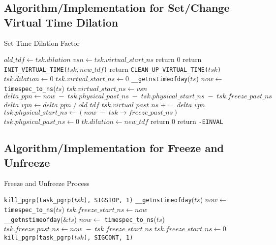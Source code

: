 \documentclass{acm_proc_article-sp}
\begin{document}
\subsection{Algorithm/Implementation for Set/Change Virtual Time Dilation}
\begin{algorithm*}[t]
\caption{Set Time Dilation Factor}
\label{Alg-SetTDF}
\begin{algorithmic}[1]
\State $old\_tdf \gets tsk.dilation$
\State $vsn \gets tsk.virtual\_start\_ns$
	\State return 0
	\State return \texttt{\uppercase{init\_virtual\_time}($tsk, new\_tdf$)}
	\State return \texttt{\uppercase{clean\_up\_virtual\_time}($tsk$)}
	\State $tsk.dilation \gets 0$
	\State $tsk.virtual\_start\_ns \gets 0$
	\State \texttt{\_\_getnstimeofday}($ts$)
	\State $now \gets$ \texttt{timespec\_to\_ns}($ts$)
	\State $tsk.virtual\_start\_ns \gets vsn$
	\State $delta\_ppn \gets now \; - \; tsk.physical\_past\_ns \; - \; tsk. physical\_start\_ns \; - \; tsk. freeze\_past\_ns$
	\State $delta\_vpn \gets delta\_ppn \; / \; old\_tdf$
	\State $tsk.virtual\_past\_ns \; += \; delta\_vpn$
	\State $tsk.physical\_start\_ns \gets (now \; - \; tsk\rightarrow freeze\_past\_ns)$
	\State $tsk.physical\_past\_ns \gets 0$
	\State $tk.dilation \gets new\_tdf$
	\State return 0
\Else
	\State return \texttt{-EINVAL}
\EndIf
\EndFunction
\end{algorithmic}
\end{algorithm*}

\subsection{Algorithm/Implementation for Freeze and Unfreeze}
\label{Sub-Sec-Alg-Impl-Freeze}
\begin{algorithm}[t]
\caption{Freeze and Unfreeze Process}
\label{Alg-Freeze}
\begin{algorithmic}[1]
\State \texttt{kill\_pgrp(task\_pgrp($tsk$), SIGSTOP, 1)}
\State \texttt{\_\_getnstimeofday}($ts$)
\State $now \gets$ \texttt{timespec\_to\_ns}($ts$)
\State $tsk.freeze\_start\_ns \gets now$
\EndFunction
\\
\State \texttt{\_\_getnstimeofday}(\&$ts$)
\State $now \gets$ \texttt{timespec\_to\_ns}($ts$)
\State $tsk.freeze\_past\_ns \gets now \; - \; tsk.freeze\_start\_ns$
\State $tsk.freeze\_start\_ns \gets 0$
\State \texttt{kill\_pgrp(task\_pgrp($tsk$), SIGCONT, 1)}
\EndFunction
\end{algorithmic}
\end{algorithm}
\end{document}

